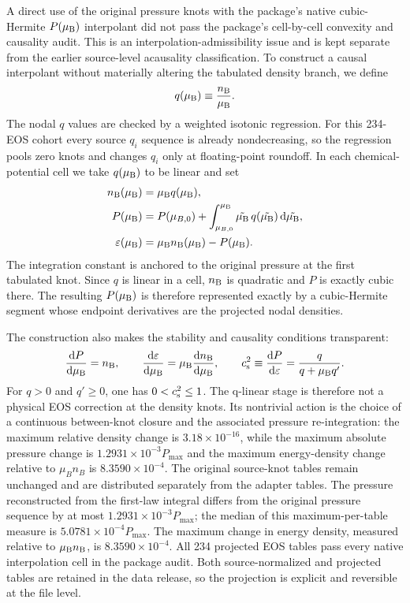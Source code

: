 \documentclass[aps,prd,twocolumn,superscriptaddress,nofootinbib]{revtex4-2}
\newcommand{\eps}{\varepsilon}
\newcommand{\mub}{\mu_{\rm B}}
\newcommand{\nb}{n_{\rm B}}
\newcommand{\cs}{c_{\rm s}}
\newcommand{\dd}{\mathrm{d}}
\begin{document}
A direct use of the original pressure knots with the package's native cubic-Hermite $P(\mub)$ interpolant did not pass the package's cell-by-cell convexity and causality audit. This is an interpolation-admissibility issue and is kept separate from the earlier source-level acausality classification. To construct a causal interpolant without materially altering the tabulated density branch, we define
\begin{equation}
q(\mub)\equiv\frac{\nb}{\mub}.
\end{equation}
The nodal $q$ values are checked by a weighted isotonic regression. For this 234-EOS cohort every source $q_i$ sequence is already nondecreasing, so the regression pools zero knots and changes $q_i$ only at floating-point roundoff. In each chemical-potential cell we take $q(\mub)$ to be linear and set
\begin{align}
\nb(\mub)&=\mub q(\mub),\\
P(\mub)&=P(\mu_{B,0})+\int_{\mu_{B,0}}^{\mub}
                 \tilde{\mub}\,q(\tilde{\mub})\,\dd\tilde{\mub},\\
\eps(\mub)&=\mub\nb(\mub)-P(\mub).
\label{eq:projection}
\end{align}
The integration constant is anchored to the original pressure at the first tabulated knot. Since $q$ is linear in a cell, $\nb$ is quadratic and $P$ is exactly cubic there. The resulting $P(\mub)$ is therefore represented exactly by a cubic-Hermite segment whose endpoint derivatives are the projected nodal densities.

The construction also makes the stability and causality conditions transparent:
\begin{equation}
\frac{\dd P}{\dd\mub}=\nb,\qquad
\frac{\dd\eps}{\dd\mub}=\mub\frac{\dd\nb}{\dd\mub},\qquad
\cs^2\equiv\frac{\dd P}{\dd\eps}
=\frac{q}{q+\mub q'}.
\label{eq:causality}
\end{equation}
For $q>0$ and $q'\geq0$, one has $0<\cs^2\leq1$. The q-linear stage is therefore not a physical EOS correction at the density knots. Its nontrivial action is the choice of a continuous between-knot closure and the associated pressure re-integration: the maximum relative density change is $3.18\times10^{-16}$, while the maximum absolute pressure change is $1.2931\times10^{-3}P_{\max}$ and the maximum energy-density change relative to $\mu_B n_B$ is $8.3590\times10^{-4}$. The original source-knot tables remain unchanged and are distributed separately from the adapter tables. The pressure reconstructed from the first-law integral differs from the original pressure sequence by at most $1.2931\times10^{-3}P_{\max}$; the median of this maximum-per-table measure is $5.0781\times10^{-4}P_{\max}$. The maximum change in energy density, measured relative to $\mub\nb$, is $8.3590\times10^{-4}$. All 234 projected EOS tables pass every native interpolation cell in the package audit. Both source-normalized and projected tables are retained in the data release, so the projection is explicit and reversible at the file level.
\end{document}
